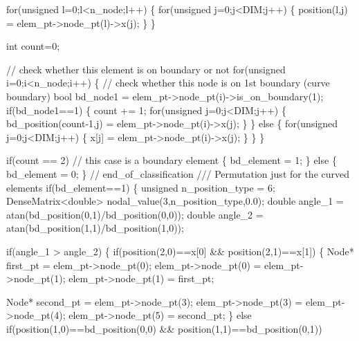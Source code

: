 \begin{DoxyCodeInclude}
     \textcolor{keywordflow}{for}(\textcolor{keywordtype}{unsigned} l=0;l<n\_node;l++)
      \{
       \textcolor{keywordflow}{for}(\textcolor{keywordtype}{unsigned} j=0;j<DIM;j++)
        \{
         position(l,j) = elem\_pt->node\_pt(l)->x(j);
        \}
      \}
    
     \textcolor{keywordtype}{int} count=0;
     
     \textcolor{comment}{// check whether this element is on boundary or not}
     \textcolor{keywordflow}{for}(\textcolor{keywordtype}{unsigned} i=0;i<n\_node;i++)
      \{
       \textcolor{comment}{// check whether this node is on 1st boundary (curve boundary)}
       \textcolor{keywordtype}{bool} bd\_node1 = elem\_pt->node\_pt(i)->is\_on\_boundary(1);
       \textcolor{keywordflow}{if}(bd\_node1==1)
        \{
         count += 1;
         \textcolor{keywordflow}{for}(\textcolor{keywordtype}{unsigned} j=0;j<DIM;j++)
          \{
           bd\_position(count-1,j) = elem\_pt->node\_pt(i)->x(j);
          \}
        \}
       \textcolor{keywordflow}{else}
        \{
         \textcolor{keywordflow}{for}(\textcolor{keywordtype}{unsigned} j=0;j<DIM;j++)
          \{
           x[j] = elem\_pt->node\_pt(i)->x(j);
          \}
        \}
      \}
     
     \textcolor{keywordflow}{if}(count == 2) \textcolor{comment}{// this case is a boundary element}
      \{
       bd\_element = 1;
      \}          
     \textcolor{keywordflow}{else}
      \{
       bd\_element = 0;           
      \} \textcolor{comment}{// end\_of\_classification}
     \textcolor{comment}{}
\textcolor{comment}{     /// Permutation just for the curved elements}
\textcolor{comment}{}     \textcolor{keywordflow}{if}(bd\_element==1)
      \{
       \textcolor{keywordtype}{unsigned} n\_position\_type = 6;
       DenseMatrix<double> nodal\_value(3,n\_position\_type,0.0);
       \textcolor{keywordtype}{double} angle\_1 = atan(bd\_position(0,1)/bd\_position(0,0));
       \textcolor{keywordtype}{double} angle\_2 = atan(bd\_position(1,1)/bd\_position(1,0));
       
       \textcolor{keywordflow}{if}(angle\_1 > angle\_2)
        \{
         \textcolor{keywordflow}{if}(position(2,0)==x[0] && position(2,1)==x[1])                                  
          \{
           Node* first\_pt = elem\_pt->node\_pt(0);
           elem\_pt->node\_pt(0) = elem\_pt->node\_pt(1);
           elem\_pt->node\_pt(1) = first\_pt;
           
           Node* second\_pt = elem\_pt->node\_pt(3);
           elem\_pt->node\_pt(3) = elem\_pt->node\_pt(4);
           elem\_pt->node\_pt(5) = second\_pt;                         
          \}
         \textcolor{keywordflow}{else} \textcolor{keywordflow}{if}(position(1,0)==bd\_position(0,0) && position(1,1)==bd\_position(0,1))                       
                 

\end{DoxyCodeInclude}
